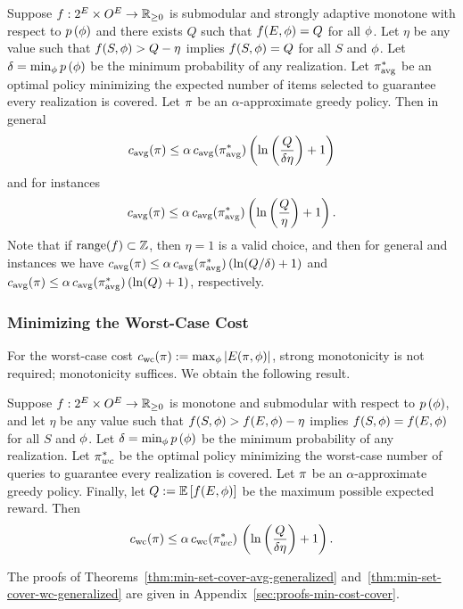\begin{theorem} \label{thm:min-set-cover-avg-generalized}
Suppose $f:2^{E} \times O^{E} \to
\mathbb{R}_{\ge 0}$ is \term submodular and strongly adaptive
monotone with respect to ${\color{black}{\ensuremath{p \left( {{\color{black}{\ensuremath{\phi}}}} \right) }}}$ and there exists $Q$ such that 
$f(E, {\color{black}{\ensuremath{\phi}}}) = Q$ for all ${\color{black}{\ensuremath{\phi}}}$.
Let $\eta$ be any value such that 
$f(S, {\color{black}{\ensuremath{\phi}}}) > Q - \eta$ implies $f(S, {\color{black}{\ensuremath{\phi}}}) = Q$ for all $S$ and
${\color{black}{\ensuremath{\phi}}}$.
Let $\delta = \min_{{\color{black}{\ensuremath{\phi}}}} {\color{black}{\ensuremath{p \left( {{\color{black}{\ensuremath{\phi}}}} \right) }}}$ be the minimum probability of
any realization. 
Let
$\pi_{\text{avg}}^*$ be an optimal policy
minimizing the expected number of items selected 
to guarantee every realization is covered.
Let $\pi$ be an $\alpha$-approximate
greedy policy. 
Then in general 
\[
{c_{\text{avg}}{(\pi)}} \le  \alpha\,
{c_{\text{avg}}{(\pi_{\text{avg}}^*)}} \left( {\ln  \left( {\frac{Q}{\delta \eta}} \right)  + 1} \right)  
\]
and for \certifying instances 
\[
{c_{\text{avg}}{(\pi)}} \le  \alpha\,
{c_{\text{avg}}{(\pi_{\text{avg}}^*)}} \left( {\ln  \left( {\frac{Q}{\eta}} \right)  + 1} \right)  
\mbox{.}
\]
Note that if $\operatorname{range}(f) \subset \mathbb{Z}$, then $\eta = 1$ is a valid
choice, and then for general and \certifying instances we have 
${c_{\text{avg}}{(\pi)}} \le  \alpha\,{c_{\text{avg}}{(\pi_{\text{avg}}^*)}} \left( {\ln (Q/\delta) + 1} \right) $
and ${c_{\text{avg}}{(\pi)}} \le
\alpha\,{c_{\text{avg}}{(\pi_{\text{avg}}^*)}} \left( {\ln (Q) + 1} \right) $, respectively.
\end{theorem}

\subsubsection{Minimizing the Worst-Case Cost}

For the worst-case cost ${c_{\text{wc}}{(\pi)}} := \max_{{\color{black}{\ensuremath{\phi}}}}{|E({\pi}, {{\color{black}{\ensuremath{\phi}}}})|}$, strong \term monotonicity is not required;
\term monotonicity suffices.  We obtain the following result.

 
\begin{theorem} \label{thm:min-set-cover-wc-generalized}
Suppose $f:2^{E} \times O^{E} \to
\mathbb{R}_{\ge 0}$ 
is \term monotone and \term submodular
with respect to ${\color{black}{\ensuremath{p \left( {{\color{black}{\ensuremath{\phi}}}} \right) }}}$, and 
let $\eta$ be any value such that 
$f(S, {\color{black}{\ensuremath{\phi}}}) > f(E, {\color{black}{\ensuremath{\phi}}}) - \eta$ implies $f(S, {\color{black}{\ensuremath{\phi}}}) =
f(E, {\color{black}{\ensuremath{\phi}}})$ for all $S$ and ${\color{black}{\ensuremath{\phi}}}$. 
Let $\delta = \min_{{\color{black}{\ensuremath{\phi}}}} {\color{black}{\ensuremath{p \left( {{\color{black}{\ensuremath{\phi}}}} \right) }}}$ be the minimum probability of
any realization. 
Let $\pi_{wc}^{*}$ be the optimal policy
minimizing the worst-case number of queries 
to guarantee every realization is covered.  Let $\pi$ be an $\alpha$-approximate
greedy policy.   
Finally, let $Q := \mathbb{E}\left[f(E, {\color{black}{\ensuremath{\phi}}})\right]$ be the
maximum possible expected reward.
Then 
\[
 {c_{\text{wc}}{(\pi)}} \le \alpha \, {c_{\text{wc}}{(\pi_{wc}^*)}}\,
  \left( {\ln  \left( {\frac{Q}{\delta \eta}} \right)  +1} \right) 
\mbox{.}
\]
\end{theorem}
\noindent 
The proofs of
Theorems~\ref{thm:min-set-cover-avg-generalized}
and~\ref{thm:min-set-cover-wc-generalized} are given in
Appendix~\ref{sec:proofs-min-cost-cover}.

